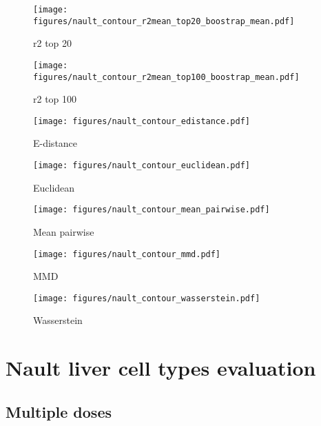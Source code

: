 \clearpage

\begin{figure}[h!]
    \centering
    \texttt{[image: figures/nault\_contour\_r2mean\_top20\_boostrap\_mean.pdf]}
    \caption{r2 top 20}
\end{figure}

\begin{figure}[h!]
    \centering
    \texttt{[image: figures/nault\_contour\_r2mean\_top100\_boostrap\_mean.pdf]}
    \caption{r2 top 100}
\end{figure}

\clearpage

\begin{figure}[h!]
    \centering
    \texttt{[image: figures/nault\_contour\_edistance.pdf]}
    \caption{E-distance}
\end{figure}

\begin{figure}[h!]
    \centering
    \texttt{[image: figures/nault\_contour\_euclidean.pdf]}
    \caption{Euclidean}
\end{figure}

\clearpage

\begin{figure}[h!]
    \centering
    \texttt{[image: figures/nault\_contour\_mean\_pairwise.pdf]}
    \caption{Mean pairwise}
\end{figure}

\begin{figure}[h!]
    \centering
    \texttt{[image: figures/nault\_contour\_mmd.pdf]}
    \caption{MMD}
\end{figure}

\clearpage

\begin{figure}[h!]
    \centering
    \texttt{[image: figures/nault\_contour\_wasserstein.pdf]}
    \caption{Wasserstein}
\end{figure}

\clearpage

\section{Nault liver cell types evaluation}


\subsection{Multiple doses}


